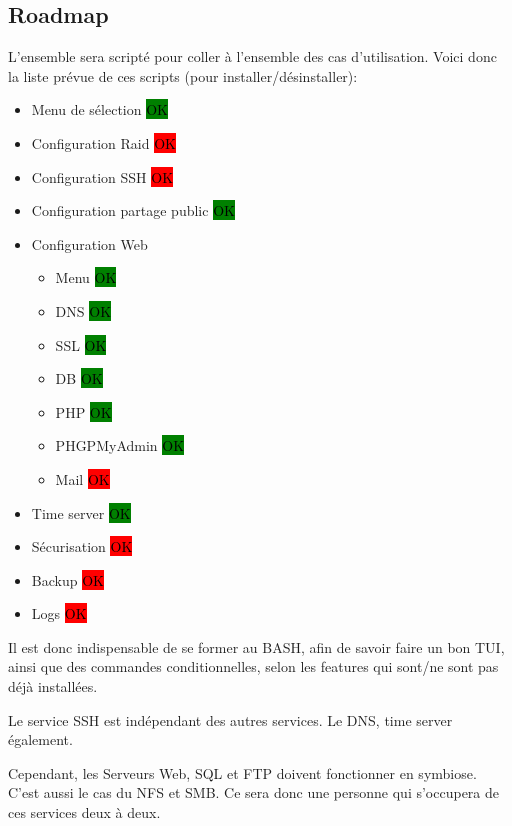 \documentclass{article}
\begin{document}
\newpage	
	
\subsection{Roadmap}
L'ensemble sera scripté pour coller à l'ensemble des cas d'utilisation. Voici donc la liste prévue de ces scripts (pour installer/désinstaller):
\begin{itemize}
\item Menu de sélection											\colorbox{green}{\textcolor{black}{OK}}
\item Configuration Raid \colorbox{red}{\textcolor{black}{OK}}	
\item Configuration SSH \colorbox{red}{\textcolor{black}{OK}}						
\item Configuration partage public 
\colorbox{green}{\textcolor{black}{OK}}							
\item Configuration Web 
\begin{itemize}
\item Menu \colorbox{green}{\textcolor{black}{OK}}							
\item DNS \colorbox{green}{\textcolor{black}{OK}}							
\item SSL \colorbox{green}{\textcolor{black}{OK}}							
\item DB \colorbox{green}{\textcolor{black}{OK}}							
\item PHP \colorbox{green}{\textcolor{black}{OK}}							
\item PHGPMyAdmin \colorbox{green}{\textcolor{black}{OK}}		
\item Mail 	\colorbox{red}{\textcolor{black}{OK}}	
\end{itemize}
\item Time server \colorbox{green}{\textcolor{black}{OK}}
\item Sécurisation \colorbox{red}{\textcolor{black}{OK}}	
\item Backup \colorbox{red}{\textcolor{black}{OK}}	
\item Logs \colorbox{red}{\textcolor{black}{OK}}	
		\end{itemize}
		
		
		Il est donc indispensable de se former au BASH, afin de savoir faire un bon TUI, ainsi que des commandes conditionnelles, selon les features qui sont/ne sont pas déjà installées.
		
		Le service SSH est indépendant des autres services. Le DNS, time server également.
		
		Cependant, les Serveurs Web, SQL et FTP doivent fonctionner en symbiose. C'est aussi le cas du NFS et SMB. Ce sera donc une personne qui s'occupera de ces services deux à deux.
	
\end{document}
